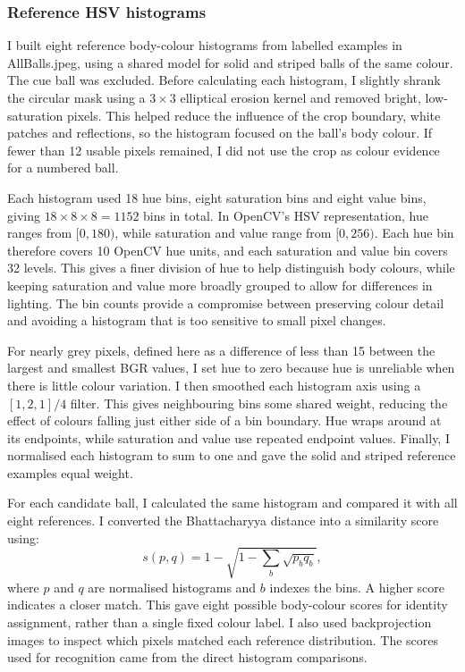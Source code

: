 \documentclass[12pt,a4paper]{article}
\begin{document}
\subsubsection{Reference HSV histograms}
I built eight reference body-colour histograms from labelled examples in
AllBalls.jpeg, using a shared model for solid and striped balls
of the same colour. The cue ball was excluded. Before calculating each
histogram, I slightly shrank the circular mask using a $3\times3$ elliptical
erosion kernel and removed bright, low-saturation pixels. This helped
reduce the influence of the crop boundary, white patches and reflections,
so the histogram focused on the ball's body colour. If fewer than 12 usable
pixels remained, I did not use the crop as colour evidence for a numbered ball.

Each histogram used 18 hue bins, eight saturation bins and eight value
bins, giving $18\times8\times8=1152$ bins in total. In OpenCV's HSV
representation, hue ranges from $[0,180)$, while saturation and value
range from $[0,256)$. Each hue bin therefore covers 10 OpenCV hue units,
and each saturation and value bin covers 32 levels. This gives a finer
division of hue to help distinguish body colours, while keeping saturation
and value more broadly grouped to allow for differences in lighting.
The bin counts provide a compromise between preserving colour detail
and avoiding a histogram that is too sensitive to small pixel changes.

For nearly grey pixels, defined here as a difference of less than 15
between the largest and smallest BGR values, I set hue to zero because
hue is unreliable when there is little colour variation. I then smoothed
each histogram axis using a $[1,2,1]/4$ filter. This gives neighbouring
bins some shared weight, reducing the effect of colours falling just
either side of a bin boundary. Hue wraps around at its endpoints, while
saturation and value use repeated endpoint values. Finally, I normalised
each histogram to sum to one and gave the solid and striped reference
examples equal weight.

For each candidate ball, I calculated the same histogram and compared it
with all eight references. I converted the Bhattacharyya distance into
a similarity score using:
\[
s(p,q)=1-\sqrt{1-\sum_b\sqrt{p_bq_b}},
\]
where $p$ and $q$ are normalised histograms and $b$ indexes the bins.
A higher score indicates a closer match. This gave eight possible
body-colour scores for identity assignment, rather than a single fixed
colour label. I also used backprojection images to inspect which pixels
matched each reference distribution. The scores used for recognition
came from the direct histogram comparisons.
\end{document}
